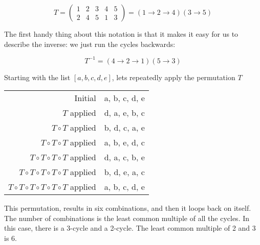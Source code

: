 $$T = \begin{pmatrix}
  1 & 2 & 3 & 4 & 5 \\
  2 & 4 & 5 & 1 & 3
\end{pmatrix} = (1 \rightarrow 2 \rightarrow 4)(3 \rightarrow 5)$$

The first handy thing about this notation is that it makes it easy for
us to describe the inverse: we just run the cycles backwards:

$$T^{-1} = (4 \rightarrow 2 \rightarrow 1)(5 \rightarrow 3)$$

Starting with the list $[a, b, c, d, e]$, lets repeatedly apply the permutation $T$

\begin{tabular}{r | l}
  Initial & {\color{red} a, b,} {\color{blue} c,} {\color{red} d,} {\color{blue} e} \\ 
  $T$ applied & {\color{red} d, a,}  {\color{blue} e,} {\color{red} b,} {\color{blue} c}\\
  $T \circ T$ applied & {\color{red} b, d,} {\color{blue} c,} {\color{red} a,}  {\color{blue} e} \\
  $T \circ T \circ T$ applied & {\color{red} a, b,}  {\color{blue} e,} {\color{red} d,} {\color{blue} c} \\
  $T \circ T \circ T \circ T$ applied & {\color{red} d, a,} {\color{blue} c,} {\color{red}b,}  {\color{blue} e} \\
  $T \circ T \circ T \circ T \circ T$ applied & {\color{red} b, d,}  {\color{blue} e,} {\color{red} a,} {\color{blue} c} \\
  $T \circ T \circ T \circ T \circ T \circ T$ applied & {\color{red} a, b,} {\color{blue} c,} {\color{red} d,}  {\color{blue} e}\\
\end{tabular}

This permutation, results in six combinations, and then it loops back
on itself. The number of combinations is the least common multiple of
all the cycles.  In this case, there is a 3-cycle and a 2-cycle. The
least common multiple of 2 and 3 is 6.

